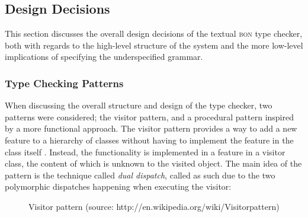 \subsection{Design Decisions}
This section discusses the overall design decisions of the textual \textsc{bon} type checker, both with regards to the high-level structure of the system and the more low-level implications of specifying the underspecified grammar.
\subsubsection{Type Checking Patterns}
\label{design-tc-patterns}
When discussing the overall structure and design of the type checker, two patterns were considered; the visitor pattern, and a procedural pattern inspired by a more functional approach.
The visitor pattern provides a way to add a new feature to a hierarchy of classes without having to implement the feature in the class itself \cite{martin2002}. Instead, the functionality is implemented in a feature in a visitor class, the content of which is unknown to the visited object. The main idea of the pattern is the technique called \textit{dual dispatch}, called as such due to the two polymorphic dispatches happening when executing the visitor: 
\begin{figure}[H]
    \caption[Visitor pattern]{Visitor pattern (source: http://en.wikipedia.org/wiki/Visitor\textunderscore pattern)}
    \label{fig:visitor-pattern}
\end{figure}
